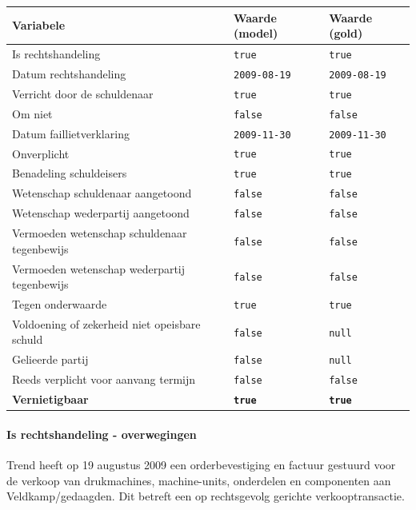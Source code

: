 \documentclass[
  dutch,
  a4paper,
]{article}
\begin{document}
\begin{center}
\small
\begin{tabular}{@{}p{7.4cm}p{2.6cm}p{2.6cm}@{}}
\toprule
Variabele & Waarde (model) & Waarde (gold) \\
\midrule
Is rechtshandeling & \texttt{true} & \texttt{true} \\
Datum rechtshandeling & \texttt{2009-08-19} & \texttt{2009-08-19} \\
Verricht door de schuldenaar & \texttt{true} & \texttt{true} \\
Om niet & \texttt{false} & \texttt{false} \\
Datum faillietverklaring & \texttt{2009-11-30} & \texttt{2009-11-30} \\
Onverplicht & \texttt{true} & \texttt{true} \\
Benadeling schuldeisers & \texttt{true} & \texttt{true} \\
Wetenschap schuldenaar aangetoond & \texttt{false} & \texttt{false} \\
Wetenschap wederpartij aangetoond & \texttt{false} & \texttt{false} \\
Vermoeden wetenschap schuldenaar tegenbewijs & \texttt{false} & \texttt{false} \\
Vermoeden wetenschap wederpartij tegenbewijs & \texttt{false} & \texttt{false} \\
Tegen onderwaarde & \texttt{true} & \texttt{true} \\
Voldoening of zekerheid niet opeisbare schuld & \texttt{false} & \texttt{null} \\
Gelieerde partij & \texttt{false} & \texttt{null} \\
Reeds verplicht voor aanvang termijn & \texttt{false} & \texttt{false} \\
\textbf{Vernietigbaar} & \textbf{\texttt{true}} & \textbf{\texttt{true}} \\
\bottomrule
\end{tabular}
\end{center}

\paragraph{Is rechtshandeling - overwegingen}\label{is-rechtshandeling---overwegingen-64}

Trend heeft op 19 augustus 2009 een orderbevestiging en factuur gestuurd voor de verkoop van drukmachines, machine-units, onderdelen en componenten aan Veldkamp/gedaagden. Dit betreft een op rechtsgevolg gerichte verkooptransactie.
\end{document}

